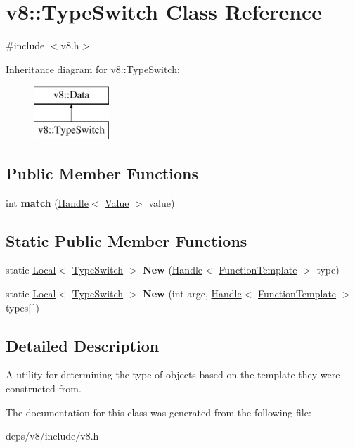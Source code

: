 \hypertarget{classv8_1_1_type_switch}{}\section{v8\+:\+:Type\+Switch Class Reference}
\label{classv8_1_1_type_switch}


{\ttfamily \#include $<$v8.\+h$>$}

Inheritance diagram for v8\+:\+:Type\+Switch\+:\begin{figure}[H]
\begin{center}
\leavevmode
\includegraphics[height=2.000000cm]{classv8_1_1_type_switch}
\end{center}
\end{figure}
\subsection*{Public Member Functions}
\begin{DoxyCompactItemize}
\item 
\hypertarget{classv8_1_1_type_switch_a678fe45db1e97ba46df7359b51752483}{}int {\bfseries match} (\hyperlink{classv8_1_1_local}{Handle}$<$ \hyperlink{classv8_1_1_value}{Value} $>$ value)\label{classv8_1_1_type_switch_a678fe45db1e97ba46df7359b51752483}

\end{DoxyCompactItemize}
\subsection*{Static Public Member Functions}
\begin{DoxyCompactItemize}
\item 
\hypertarget{classv8_1_1_type_switch_ac94aac0b1ba0bde763bc8b6ae6aea532}{}static \hyperlink{classv8_1_1_local}{Local}$<$ \hyperlink{classv8_1_1_type_switch}{Type\+Switch} $>$ {\bfseries New} (\hyperlink{classv8_1_1_local}{Handle}$<$ \hyperlink{classv8_1_1_function_template}{Function\+Template} $>$ type)\label{classv8_1_1_type_switch_ac94aac0b1ba0bde763bc8b6ae6aea532}

\item 
\hypertarget{classv8_1_1_type_switch_a47003915e553a7ca2285b8a0bf42993b}{}static \hyperlink{classv8_1_1_local}{Local}$<$ \hyperlink{classv8_1_1_type_switch}{Type\+Switch} $>$ {\bfseries New} (int argc, \hyperlink{classv8_1_1_local}{Handle}$<$ \hyperlink{classv8_1_1_function_template}{Function\+Template} $>$ types\mbox{[}$\,$\mbox{]})\label{classv8_1_1_type_switch_a47003915e553a7ca2285b8a0bf42993b}

\end{DoxyCompactItemize}


\subsection{Detailed Description}
A utility for determining the type of objects based on the template they were constructed from. 

The documentation for this class was generated from the following file\+:\begin{DoxyCompactItemize}
\item 
deps/v8/include/v8.\+h\end{DoxyCompactItemize}
